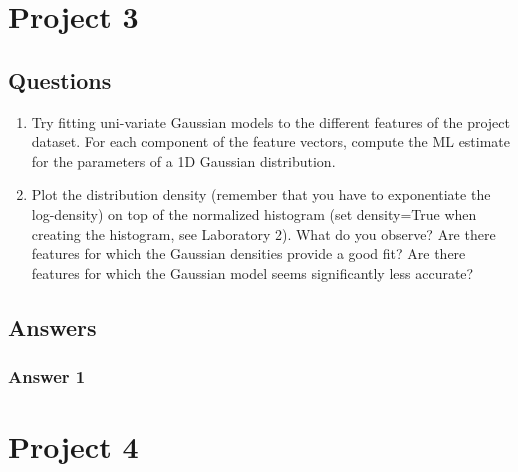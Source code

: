 \documentclass[a4paper, 12pt, english]{article}
\begin{document}
    \newpage


    \section{Project 3}

    \subsection{Questions}
    \begin{enumerate}
        \item Try fitting uni-variate Gaussian models to the different features of the project dataset. For each component of the feature vectors, compute the ML estimate for the parameters of a 1D Gaussian distribution.
        \item Plot the distribution density (remember that you have to exponentiate the log-density) on top of the normalized histogram (set density=True when creating the histogram, see Laboratory 2). What do you observe? Are there features for which the Gaussian densities provide a good fit? Are there features for which the Gaussian model seems significantly less accurate?
    \end{enumerate}

    \subsection{Answers}

    \subsubsection{Answer 1}

    \newpage


    \section{Project 4}
\end{document}
